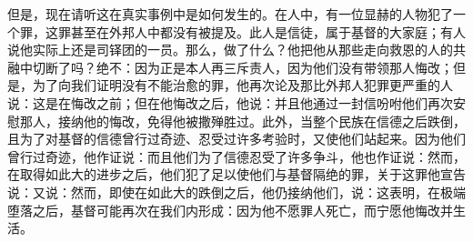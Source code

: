 但是，现在请听这在真实事例中是如何发生的。在人中，有一位显赫的人物犯了一个罪，这罪甚至在外邦人中都没有被提及。此人是信徒，属于基督的大家庭；有人说他实际上还是司铎团的一员。那么，做了什么？他把他从那些走向救恩的人的共融中切断了吗？绝不：因为正是本人再三斥责人，因为他们没有带领那人悔改；但是，为了向我们证明没有不能治愈的罪，他再次论及那比外邦人犯罪更严重的人说：这是在悔改之前；但在他悔改之后，他说：并且他通过一封信吩咐他们再次安慰那人，接纳他的悔改，免得他被撒殚胜过。此外，当整个民族在信德之后跌倒，且为了对基督的信德曾行过奇迹、忍受过许多考验时，又使他们站起来。因为他们曾行过奇迹，他作证说：而且他们为了信德忍受了许多争斗，他也作证说：然而，在取得如此大的进步之后，他们犯了足以使他们与基督隔绝的罪，关于这罪他宣告说：又说：然而，即使在如此大的跌倒之后，他仍接纳他们，说：这表明，在极端堕落之后，基督可能再次在我们内形成：因为他不愿罪人死亡，而宁愿他悔改并生活。\par

